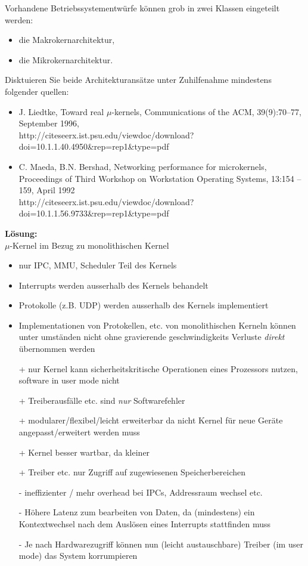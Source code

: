 

\begin{description}

Vorhandene Betriebssystementwürfe können grob in zwei Klassen eingeteilt werden:
\begin{itemize}
	\item die Makrokernarchitektur,
	\item die Mikrokernarchitektur.
\end{itemize}
Disktuieren Sie beide Architekturansätze unter Zuhilfenahme mindestens folgender quellen:
\footnotesize{\begin{itemize}
	\item J. Liedtke, Toward real $\mu$-kernels, Communications of the ACM, 39(9):70--77, September 1996, \\http://citeseerx.ist.psu.edu/viewdoc/download?doi=10.1.1.40.4950\&rep=rep1\&type=pdf
	\item C. Maeda, B.N. Bershad, Networking performance for microkernels, Proceedings of Third Workshop on Workstation Operating Systems, 13:154 – 159, April 1992 \\http://citeseerx.ist.psu.edu/viewdoc/download?doi=10.1.1.56.9733\&rep=rep1\&type=pdf 
\end{itemize}}

\textbf{Lösung:}\\
\(\mu\)-Kernel im Bezug zu monolithischen Kernel

\begin{itemize}
  \item nur IPC, MMU, Scheduler Teil des Kernels
  \item Interrupts werden ausserhalb des Kernels behandelt
  \item Protokolle (z.B. UDP) werden ausserhalb des Kernels implementiert
  \item Implementationen von Protokellen, etc. von monolithischen Kerneln können unter umständen nicht ohne gravierende geschwindigkeits Verluste \emph{direkt} übernommen werden
  \item[+] nur Kernel kann sicherheitskritische Operationen eines Prozessors nutzen, software in user mode nicht
  \item[+] Treiberausfälle etc. sind \emph{nur} Softwarefehler
  \item[+] modularer/flexibel/leicht erweiterbar da nicht Kernel für neue Geräte angepasst/erweitert werden muss
  \item[+] Kernel besser wartbar, da kleiner
  \item[+] Treiber etc. nur Zugriff auf zugewiesenen Speicherbereichen
  \item[-] ineffizienter / mehr overhead bei IPCs, Addressraum wechsel etc.
  \item[-] Höhere Latenz zum bearbeiten von Daten, da (mindestens) ein Kontextwechsel nach dem Auslösen eines Interrupts stattfinden muss
  \item[-] Je nach Hardwarezugriff können nun (leicht austauschbare) Treiber (im user mode) das System korrumpieren
\end{itemize}



\end{description}
